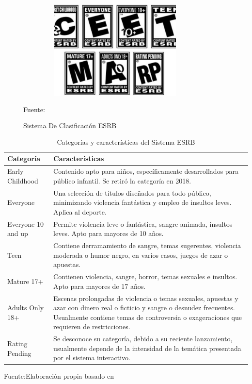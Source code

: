 \begin{figure}[h!]
	\centering
	\includegraphics[width=10cm,height=5cm,]{./Images/esrb.jpg}
	\caption{Sistema De Clasificación ESRB}
	\footnotesize Fuente: \cite{esrb}
	\label{esrb}
\end{figure}
\begin{table}[h!]
	\begin{center}
		\begin{tabular}{| m{4cm} | m{10cm} | }
			\hline Categoría & Características \\ \hline
			Early Childhood & Contenido apto para niños, específicamente desarrollados para
			público infantil. Se retiró la categoría en 2018. \\ \hline
			Everyone & Una selección de títulos diseñados para todo público, minimizando
			violencia fantástica y empleo de insultos leves. Aplica al deporte. \\ \hline
			Everyone 10 and up & Permite violencia leve o fantástica, sangre animada, insultos leves. Apto para mayores de 10 años. \\ \hline
			Teen & Contiene derramamiento de sangre, temas sugerentes, violencia moderada
			o humor negro, en varios casos, juegos de azar o apuestas. \\ \hline
			Mature 17+ & Contienen violencia, sangre, horror, temas sexuales e insultos. Apto
			para mayores de 17 años. \\ \hline
			Adults Only 18+ & Escenas prolongadas de violencia o temas sexuales, apuestas y
			azar con dinero real o ficticio y sangre o desnudez frecuentes. Usualmente contiene
			temas de controversia o exageraciones que requieren de restricciones. \\ \hline
			Rating Pending & Se desconoce su categoría, debido a su reciente lanzamiento,
			usualmente depende de la intensidad de la temática presentada por el sistema
			interactivo. \\ \hline
		\end{tabular}
		\caption{Categorías y características del Sistema ESRB}
		\footnotesize Fuente:Elaboración propia basado en \cite{esrb}
	\end{center}
\end{table}



